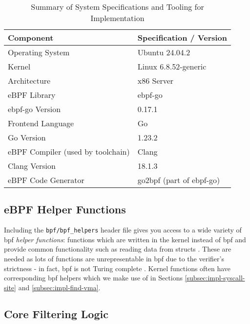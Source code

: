 \begin{table}[h] %
\centering
\caption{Summary of System Specifications and Tooling for \af Implementation}
\label{tab:specs_tooling}
\begin{tabular}{ll}
\toprule %
\textbf{Component} & \textbf{Specification / Version} \\
\midrule %
Operating System      & Ubuntu 24.04.2 \\
Kernel                & Linux 6.8.52-generic \\
Architecture          & x86 Server \\
eBPF Library          & ebpf-go \\
ebpf-go Version       & 0.17.1 \\
Frontend Language     & Go \\
Go Version            & 1.23.2 \\
eBPF Compiler (used by toolchain) & Clang \\
Clang Version         & 18.1.3 \\
eBPF Code Generator   & go2bpf (part of ebpf-go) \\
\bottomrule %
\end{tabular}
\end{table}

\subsection{eBPF Helper Functions}

Including the \texttt{bpf/bpf\_helpers} header file gives you access to a wide
variety of \ac{bpf} \textit{helper functions}: functions which are written in
the kernel instead of \ac{bpf} and provide common functionality such as reading
data from structs \cite{ebpf-helper-functions-2025, ebpf-bpf-probe-read-user-2024}. 
These are needed as lots of functions are unrepresentable in 
\ac{bpf} due to the verifier's strictness - in fact, \ac{bpf} is not Turing
complete \cite{gregg-bpf-performance-tools-2019}. Kernel functions often have
corresponding \ac{bpf} helpers which we make use of in Sections
\ref{subsec:impl-syscall-site} and \ref{subsec:impl-find-vma}.

\subsection{Core Filtering Logic}

